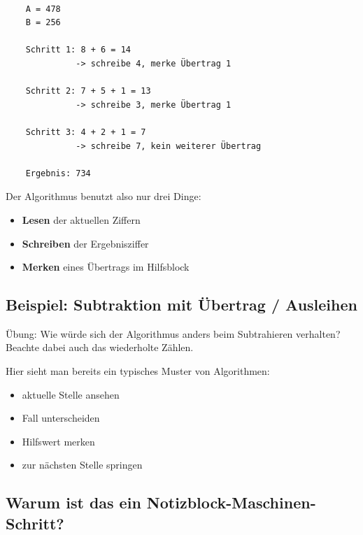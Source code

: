 \documentclass{article}
\begin{document}
        
  \begin{verbatim}

    A = 478
    B = 256

    Schritt 1: 8 + 6 = 14
              -> schreibe 4, merke Übertrag 1

    Schritt 2: 7 + 5 + 1 = 13
              -> schreibe 3, merke Übertrag 1

    Schritt 3: 4 + 2 + 1 = 7
              -> schreibe 7, kein weiterer Übertrag

    Ergebnis: 734
          \end{verbatim}

        
  Der Algorithmus benutzt also nur drei Dinge:

          \begin{itemize}
            \item \textbf{Lesen} der aktuellen Ziffern
            \item \textbf{Schreiben} der Ergebnisziffer
            \item \textbf{Merken} eines Übertrags im Hilfsblock

          \end{itemize}


          \subsection{Beispiel: Subtraktion mit Übertrag / Ausleihen}

        Übung: Wie würde sich der Algorithmus anders beim Subtrahieren verhalten? Beachte dabei auch das wiederholte Zählen.
        
  Hier sieht man bereits ein typisches Muster von Algorithmen:

          \begin{itemize}
            \item aktuelle Stelle ansehen
            \item Fall unterscheiden
            \item Hilfswert merken
            \item zur nächsten Stelle springen

          \end{itemize}


          \subsection{Warum ist das ein Notizblock-Maschinen-Schritt?}
\end{document}
